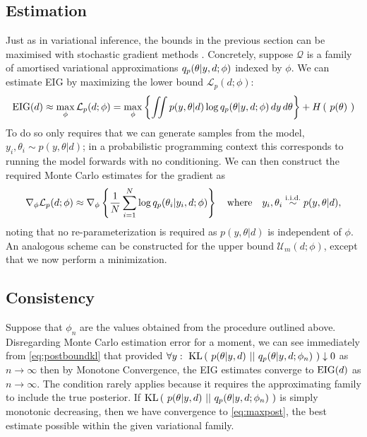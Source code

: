 \subsection{Estimation}
Just as in variational inference, the bounds in the previous section can be maximised with stochastic gradient methods \cite{robbins1951stochastic}. Concretely, suppose $\mathcal{Q}$ is a family of amortised variational approximations $q_p(\theta | y, d; \phi)$  indexed by $\phi$. We can estimate EIG by maximizing the lower bound $\mathcal{L}_p(d;\phi)$:
\begin{equation}
	\label{eq:maxpost}
	\text{EIG}(d) \approx \max_\phi \mathcal{L}_p(d;\phi) =
	\max_\phi \left\{ \iint p(y, \theta | d) \log q_p (\theta | y, d; \phi)\, dy\, d\theta  \right\} + H\left(\ p(\theta)\ \right)
\end{equation}
To do so only requires  that we can generate samples from the model,
$y_i, \theta_i \sim p(y, \theta | d)$; 
in a probabilistic programming context this corresponds to running the model forwards with no conditioning.
We can then construct the required Monte Carlo estimates for the gradient as
\begin{equation}
\nabla_{\phi} \mathcal{L}_p(d;\phi) \approx \nabla_\phi \left\{\frac{1}{N}\sum_{i=1}^N \log q_p(\theta_i|y_i, d; \phi)\right\} \quad \text{where} \quad y_i, \theta_i \overset{\tiny{\text{i.i.d.}}}{\sim} p(y, \theta | d),
\end{equation}
noting that no re-parameterization is required as $p(y,\theta|d)$ is independent of $\phi$.
An analogous scheme can be constructed for the upper bound $\mathcal{U}_m(d;\phi)$, except that we now
perform a minimization.

\subsection{Consistency}
Suppose that $\phi_n$ are the values obtained from the procedure outlined above. Disregarding Monte Carlo estimation error for a moment, we can see immediately from \eqref{eq:postboundkl} that provided $\forall y:\  \text{KL}\left(\ p(\theta | y, d)\ ||\ q_p(\theta|y, d; \phi_n)\ \right) \downarrow 0$ as $n \to \infty$ then by Monotone Convergence, the EIG estimates converge to $\text{EIG}(d)$ as $n \to \infty$. The condition rarely applies because it requires the approximating family to include the true posterior. If $\text{KL}\left(\ p(\theta | y, d)\ ||\ q_p(\theta|y, d; \phi_n)\ \right)$ is simply monotonic decreasing, then we have convergence to \eqref{eq:maxpost}, the best estimate possible within the given variational family.


